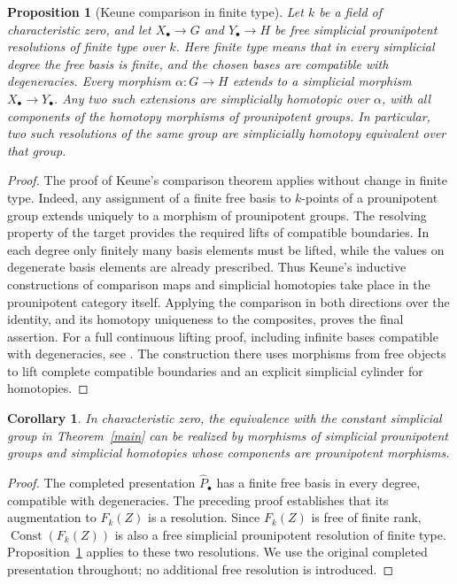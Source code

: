 \documentclass[11pt,a4paper]{article}
\newtheorem{proposition}[theorem]{Proposition}
\newtheorem{corollary}[theorem]{Corollary}
\begin{document}
\begin{proposition}[Keune comparison in finite type]\label{prop:keune-finite-type}
Let $k$ be a field of characteristic zero, and let
$X_\bullet\to G$ and $Y_\bullet\to H$ be free simplicial
prounipotent resolutions of finite type over $k$.  Here finite type means
that in every simplicial degree the free basis is finite, and the chosen
bases are compatible with degeneracies.  Every morphism $\alpha:G\to H$
extends to a simplicial morphism $X_\bullet\to Y_\bullet$.
Any two such extensions are simplicially homotopic over $\alpha$, with
all components of the homotopy morphisms of prounipotent groups.
In particular, two such resolutions of the same group are simplicially
homotopy equivalent over that group.
\end{proposition}
\begin{proof}
The proof of Keune's comparison theorem
\cite[Theorem~2]{Ke} applies without change in finite type.
Indeed, any assignment of a finite free basis to $k$-points of a
prounipotent group extends uniquely to a morphism of prounipotent groups.
The resolving property of the target provides the required lifts of
compatible boundaries.  In each degree only finitely many basis elements
must be lifted, while the values on degenerate basis elements are already
prescribed.  Thus Keune's inductive constructions of comparison maps and
simplicial homotopies take place in the prounipotent category itself.
Applying the comparison in both directions over the identity, and its
homotopy uniqueness to the composites, proves the final assertion.
For a full continuous lifting proof, including infinite bases compatible
with degeneracies, see \cite[Proposition~3.1 and Theorem~4.2]{MikhContinuous}.
The construction there uses morphisms from free objects to lift complete
compatible boundaries and an explicit simplicial cylinder for homotopies.
\end{proof}

\begin{corollary}\label{cor:prounipotent-model-comparison}
In characteristic zero, the equivalence with the constant simplicial group
in Theorem~\ref{main} can be realized by morphisms of simplicial
prounipotent groups and simplicial homotopies whose components are
prounipotent morphisms.
\end{corollary}
\begin{proof}
The completed presentation $\widehat P_\bullet$ has a finite free basis
in every degree, compatible with degeneracies.  The preceding proof
establishes that its augmentation to $F_k(Z)$ is a resolution.
Since $F_k(Z)$ is free of finite rank, $\operatorname{Const}(F_k(Z))$
is also a free simplicial prounipotent resolution of finite type.
Proposition~\ref{prop:keune-finite-type} applies to these two resolutions.
We use the original completed presentation throughout; no additional
free resolution is introduced.
\end{proof}
\end{document}
